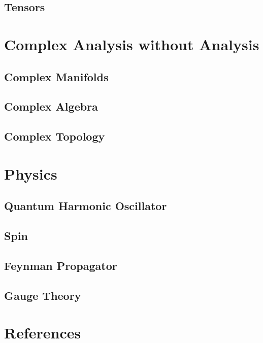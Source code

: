 \documentclass[12pt]{article}
\theoremstyle{definition}
\theoremstyle{remark}
\theoremstyle{example}
\theoremstyle{theorem}
\theoremstyle{lemma}
\begin{document}
\subsection{Tensors}

\section{Complex Analysis without Analysis}

\subsection{Complex Manifolds}

\subsection{Complex Algebra}

\subsection{Complex Topology}

\section{Physics}

\subsection{Quantum Harmonic Oscillator}

\subsection{Spin}

\subsection{Feynman Propagator}

\subsection{Gauge Theory}



\section{References}
\end{document}
